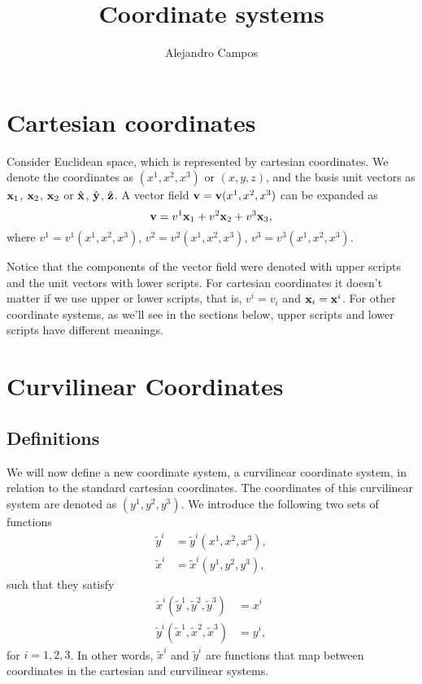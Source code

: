 \documentclass[11pt]{article}
\title{Coordinate systems}
\author{Alejandro Campos}
\newcommand{\xtilde}{\tilde{x}}
\newcommand{\ytilde}{\tilde{y}}
\begin{document}
\maketitle
\tableofcontents

\section{Cartesian coordinates}
Consider Euclidean space, which is represented by cartesian coordinates. We denote the coordinates as $(x^1,x^2,x^3)$ or $(x,y,z)$, and the basis unit vectors as $\mathbf{x}_1$, $\mathbf{x}_2$, $\mathbf{x}_2$ or $\hat{\mathbf{x}}$, $\hat{\mathbf{y}}$, $\hat{\mathbf{z}}$. A vector field $\mathbf{v} = \mathbf{v}(x^1, x^2, x^3)$ can be expanded as 
\begin{equation}
    \label{eq:vector_cartesian}
    \mathbf{v} = v^1 \mathbf{x}_1 + v^2 \mathbf{x}_2 + v^3 \mathbf{x}_3,
\end{equation}
where $v^1 = v^1(x^1, x^2, x^3)$, $v^2 = v^2(x^1, x^2, x^3)$, $v^3 = v^3(x^1, x^2, x^3)$. 

Notice that the components of the vector field were denoted with upper scripts and the unit vectors with lower scripts. For cartesian coordinates it doesn't matter if we use upper or lower scripts, that is, $v^i = v_i$ and $\mathbf{x}_i=\mathbf{x}^i$. For other coordinate systems, as we'll see in the sections below, upper scripts and lower scripts have different meanings.

\section{Curvilinear Coordinates}

\subsection{Definitions}
We will now define a new coordinate system, a curvilinear coordinate system, in relation to the standard cartesian coordinates. The coordinates of this curvilinear system are denoted as $(y^1, y^2, y^3)$. We introduce the following two sets of functions
\begin{align}
\ytilde^i &= \ytilde^i(x^1, x^2, x^3), \label{eq:generic_xtoy} \\
\xtilde^i &= \xtilde^i(y^1,y^2,y^3), \label{eq:generic_ytox}
\end{align}
such that they satisfy
\begin{align}
    \xtilde^i(\ytilde^1, \ytilde^2, \ytilde^3) &= x^i \label{eq:trans1}\\
    \ytilde^i(\xtilde^1, \xtilde^2, \xtilde^3) &= y^i \label{eq:trans2},
\end{align}
for $i=1,2,3$. In other words, $\xtilde^i$ and $\ytilde^i$ are functions that map between coordinates in the cartesian and curvilinear systems. 
\end{document}
